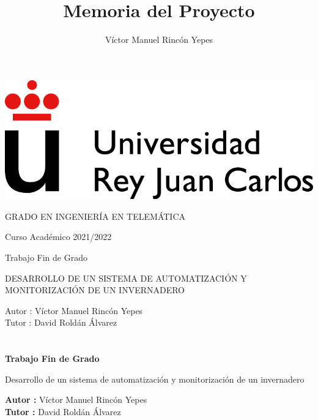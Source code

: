 \documentclass[a4paper, 12pt, oneside]{book}
\title{Memoria del Proyecto}
\author{Víctor Manuel Rincón Yepes}
\begin{document}
\renewcommand{\refname}{Bibliografía}  %
\renewcommand{\appendixname}{Apéndice}


\begin{titlepage}
\begin{center}
\includegraphics[scale=0.8]{img/URJ_logo_Color_POS.png}

\vspace{1.75cm}

\Large
GRADO EN INGENIERÍA EN TELEMÁTICA

\vspace{0.4cm}

\large
Curso Académico 2021/2022

\vspace{0.8cm}

Trabajo Fin de Grado

\vspace{2.5cm}

\LARGE
DESARROLLO DE UN SISTEMA DE AUTOMATIZACIÓN Y MONITORIZACIÓN DE UN INVERNADERO

\vspace{4cm}

\large
Autor : Víctor Manuel Rincón Yepes \\
Tutor : David Roldán Álvarez \\
\end{center}
\end{titlepage}

\newpage
\mbox{}
\thispagestyle{empty} %


\clearpage
{}
\chapter*{}

\vspace{-4cm}
\begin{center}
\LARGE
\textbf{Trabajo Fin de Grado}

\vspace{1cm}
\large
Desarrollo de un sistema de automatización y monitorización de un invernadero

\vspace{1cm}
\large
\textbf{Autor :} Víctor Manuel Rincón Yepes \\
\textbf{Tutor :} David Roldán Álvarez

\end{center}
\end{document}
